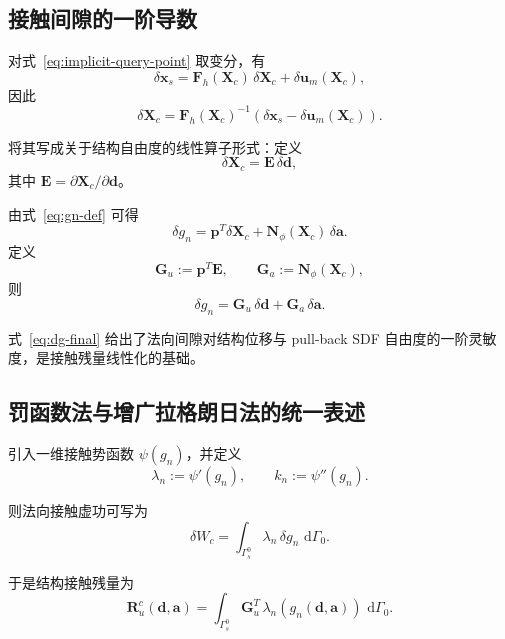\documentclass[12pt,a4paper]{ctexart}
\numberwithin{equation}{section}
\newcommand{\bF}{\bm{F}}
\newcommand{\bp}{\bm{p}}
\newcommand{\bE}{\bm{E}}
\newcommand{\bN}{\bm{N}}
\newcommand{\bd}{\bm{d}}
\newcommand{\ba}{\bm{a}}
\newcommand{\bx}{\bm{x}}
\newcommand{\bX}{\bm{X}}
\newcommand{\bu}{\bm{u}}
\newcommand{\dd}{\,\mathrm{d}}
\begin{document}
\subsection{接触间隙的一阶导数}

对式~\eqref{eq:implicit-query-point} 取变分，有
\begin{equation}
\delta \bx_s
=
\bF_h(\bX_c)\,\delta \bX_c + \delta \bu_m(\bX_c),
\end{equation}
因此
\begin{equation}
\delta \bX_c
=
\bF_h(\bX_c)^{-1}
\left(
\delta \bx_s - \delta \bu_m(\bX_c)
\right).
\label{eq:dXc}
\end{equation}

将其写成关于结构自由度的线性算子形式：定义
\begin{equation}
\delta\bX_c = \bE\,\delta \bd,
\label{eq:E-def}
\end{equation}
其中 $\bE = \partial \bX_c / \partial \bd$。

由式~\eqref{eq:gn-def} 可得
\begin{equation}
\delta g_n = \bp^T\delta \bX_c + \bN_\phi(\bX_c)\,\delta\ba.
\end{equation}
定义
\begin{equation}
\boxed{
\bm{G}_u := \bp^T\bE,
\qquad
\bm{G}_a := \bN_\phi(\bX_c),
}
\label{eq:Gu-Ga-def}
\end{equation}
则
\begin{equation}
\boxed{
\delta g_n = \bm{G}_u\,\delta\bd + \bm{G}_a\,\delta\ba.
}
\label{eq:dg-final}
\end{equation}

式~\eqref{eq:dg-final} 给出了法向间隙对结构位移与 pull-back SDF 自由度的一阶灵敏度，是接触残量线性化的基础。

\subsection{罚函数法与增广拉格朗日法的统一表述}

引入一维接触势函数 $\psi(g_n)$，并定义
\begin{equation}
\lambda_n := \psi'(g_n),
\qquad
k_n := \psi''(g_n).
\label{eq:lambdan-kn}
\end{equation}

则法向接触虚功可写为
\begin{equation}
\delta W_c
=
\int_{\Gamma_s^0} \lambda_n\, \delta g_n\,\dd\Gamma_0.
\end{equation}

于是结构接触残量为
\begin{equation}
\boxed{
\bm{R}_u^c(\bd,\ba)
=
\int_{\Gamma_s^0}
\bm{G}_u^T\,\lambda_n(g_n(\bd,\ba))\,\dd\Gamma_0.
}
\label{eq:Ru-contact}
\end{equation}
\end{document}
